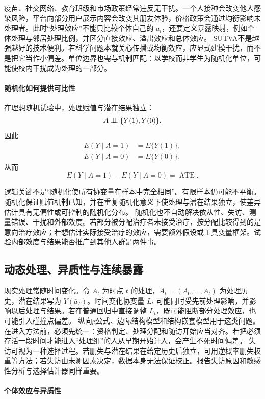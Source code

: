 疫苗、社交网络、教育班级和市场政策经常违反无干扰。一个人接种会改变他人感染风险，平台向部分用户展示内容会改变其朋友体验，价格政策会通过均衡影响未处理者。此时“处理效应”不能只比较个体自己的 $a_i$，还要定义暴露映射，例如个体处理与邻居处理比例，并区分直接效应、溢出效应和总体效应。
SUTVA不是越强越好的技术便利。若科学问题本就关心传播或均衡效应，应显式建模干扰，而不是把它当作小偏差。单位边界也需与机制匹配：以学校而非学生为随机化单位，可能使校内干扰成为处理的一部分。

\paragraph{随机化如何提供可比性}

在理想随机试验中，处理赋值与潜在结果独立：
\[
A\mathrel{\perp\!\!\!\perp}\{Y(1),Y(0)\}.
\]
因此
\begin{align*}
E(Y\mid A=1)&=E\{Y(1)\},\\
E(Y\mid A=0)&=E\{Y(0)\},
\end{align*}
从而
\[
E(Y\mid A=1)-E(Y\mid A=0)=\operatorname{ATE}.
\]

逻辑关键不是“随机化使所有协变量在样本中完全相同”。有限样本仍可能不平衡。随机化保证赋值机制已知，并在重复随机化意义下使处理与潜在结果独立，使差异估计具有无偏性或可控制的随机化分布。
随机化也不自动解决依从性、失访、测量错误、干扰和外部效度。若部分被分配治疗者未接受治疗，按分配比较得到的是意向治疗效应；若想估计实际接受治疗的效应，需要额外假设或工具变量框架。试验内部效度与结果能否推广到其他人群是两件事。

\subsection{动态处理、异质性与连续暴露}

现实处理常随时间变化。令 $A_t$ 为时点 $t$ 的处理，$\bar A_t=(A_0,\ldots,A_t)$ 为处理历史，潜在结果写为 $Y(\bar a_T)$。时间变化协变量 $L_t$ 可能同时受先前处理影响，并影响以后处理与结果。若在普通回归中直接调整 $L_t$，既可能阻断部分处理效应，也可能引入碰撞点偏差。
纵向g公式、边际结构模型和结构嵌套模型用于这类问题\parencite{robins1986,hernanrobins2020}。在进入方法前，必须先统一：资格判定、处理分配和随访开始应当对齐。若把必须存活一段时间才能进入“处理组”的人从早期开始计入，会产生不死时间偏差。
失访可视为一种选择过程。若删失与潜在结果在给定历史后独立，可用逆概率删失权重等方法；若失访由未测因素决定，数据本身无法保证校正。报告失访原因和敏感性分析与选择估计器同样重要。

\paragraph{个体效应与异质性}

